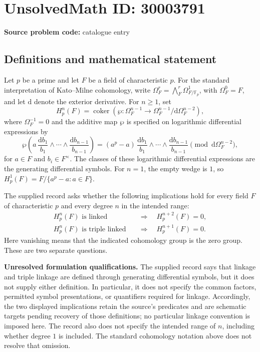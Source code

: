 \documentclass[11pt]{article}
\begin{document}
\section*{UnsolvedMath ID: 30003791}
\textbf{Source problem code:} catalogue entry
\subsection{Definitions and mathematical statement}
Let \(p\) be a prime and let \(F\) be a field of characteristic \(p\). For the standard interpretation of Kato--Milne cohomology, write \(\Omega_F^r=\bigwedge_F^r\Omega^1_{F/\mathbb F_p}\), with \(\Omega_F^0=F\), and let \(\mathrm d\) denote the exterior derivative. For \(n\geq 1\), set
\[
H_p^n(F)=\operatorname{coker}\!\left(\wp:\Omega_F^{n-1}\longrightarrow \Omega_F^{n-1}/\mathrm d\Omega_F^{n-2}\right),
\]
where \(\Omega_F^{-1}=0\) and the additive map \(\wp\) is specified on logarithmic differential expressions by
\[
\wp\!\left(a\,\frac{\mathrm d b_1}{b_1}\wedge\cdots\wedge\frac{\mathrm d b_{n-1}}{b_{n-1}}\right)
= (a^p-a)\,\frac{\mathrm d b_1}{b_1}\wedge\cdots\wedge\frac{\mathrm d b_{n-1}}{b_{n-1}}
\pmod{\mathrm d\Omega_F^{n-2}},
\]
for \(a\in F\) and \(b_i\in F^\times\). The classes of these logarithmic differential expressions are the generating differential symbols. For \(n=1\), the empty wedge is \(1\), so \(H_p^1(F)=F/\{a^p-a:a\in F\}\).

The supplied record asks whether the following implications hold for every field \(F\) of characteristic \(p\) and every degree \(n\) in the intended range:
\[
\begin{aligned}
H_p^n(F)\text{ is linked}&\quad\Longrightarrow\quad H_p^{n+2}(F)=0,\\
H_p^n(F)\text{ is triple linked}&\quad\Longrightarrow\quad H_p^{n+1}(F)=0.
\end{aligned}
\]
Here vanishing means that the indicated cohomology group is the zero group. These are two separate questions.

\textbf{Unresolved formulation qualifications.} The supplied record says that linkage and triple linkage are defined through generating differential symbols, but it does not supply either definition. In particular, it does not specify the common factors, permitted symbol presentations, or quantifiers required for linkage. Accordingly, the two displayed implications retain the source's predicates and are schematic targets pending recovery of those definitions; no particular linkage convention is imposed here. The record also does not specify the intended range of \(n\), including whether degree \(1\) is included. The standard cohomology notation above does not resolve that omission.
\end{document}
